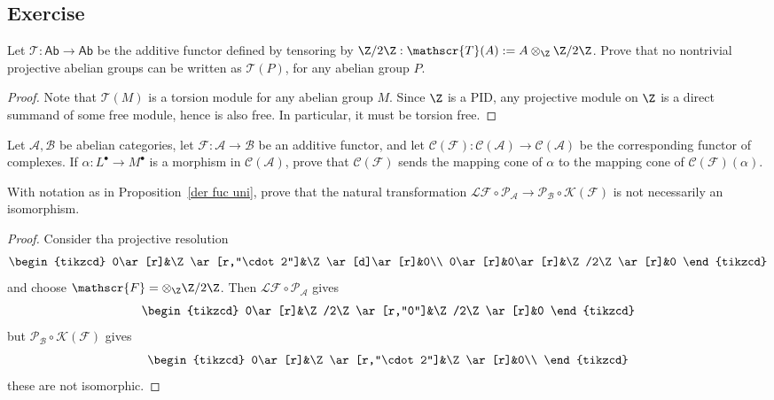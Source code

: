 \subsection{Exercise}
\begin{exercise}
Let $\mathscr{T}:\mathsf{Ab}\to\mathsf{Ab}$ be the additive functor defined by tensoring by $\Z/2\Z:\mathscr{T}(A):=A\otimes_{\Z}\Z/2\Z$. Prove that no nontrivial projective abelian groups can be written as $\mathscr{T}(P)$, for any abelian group $P$.
\end{exercise}
\begin{proof}
Note that $\mathscr{T}(M)$ is a torsion module for any abelian group $M$. Since $\Z$ is a PID, any projective module on $\Z$ is a direct summand of some free module, hence is also free. In particular, it must be torsion free.
\end{proof}
\begin{exercise}
Let $\mathcal{A},\mathcal{B}$ be abelian categories, let $\mathscr{F}:\mathcal{A}\to\mathcal{B}$ be an additive functor, and let $\mathcal{C}(\mathscr{F}):\mathcal{C}(\mathcal{A})\to\mathcal{C}(\mathcal{A})$ be the corresponding functor of complexes. If $\alpha:L^\bullet\to M^\bullet$ is a morphism in $\mathcal{C}(\mathcal{A})$, prove that $\mathcal{C}(\mathscr{F})$ sends the mapping cone of $\alpha$ to the mapping cone of $\mathcal{C}(\mathscr{F})(\alpha)$.
\end{exercise}
\begin{exercise}
With notation as in Proposition~\ref{der fuc uni}, prove that the natural transformation $\mathcal{L}\mathscr{F}\circ\mathscr{P}_{\mathcal{A}}\to\mathscr{P}_{\mathcal{B}}\circ\mathcal{K}(\mathscr{F})$ is not necessarily an isomorphism.
\end{exercise}
\begin{proof}
Consider tha projective resolution
\[\begin{tikzcd}
0\ar[r]&\Z\ar[r,"\cdot 2"]&\Z\ar[d]\ar[r]&0\\
0\ar[r]&0\ar[r]&\Z/2\Z\ar[r]&0
\end{tikzcd}\]
and choose $\mathscr{F}=\otimes_{\Z}\Z/2\Z$. Then $\mathcal{L}\mathscr{F}\circ\mathscr{P}_{\mathcal{A}}$ gives
\[\begin{tikzcd}
0\ar[r]&\Z/2\Z\ar[r,"0"]&\Z/2\Z\ar[r]&0
\end{tikzcd}\]
but $\mathscr{P}_{\mathcal{B}}\circ\mathcal{K}(\mathscr{F})$ gives
\[\begin{tikzcd}
0\ar[r]&\Z\ar[r,"\cdot 2"]&\Z\ar[r]&0\\
\end{tikzcd}\]
these are not isomorphic.
\end{proof}
